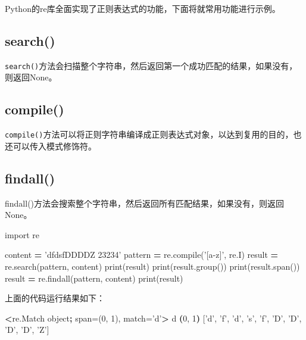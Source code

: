 \documentclass[]{ctexbook}
\newenvironment{Shaded}{\begin{snugshade}}{\end{snugshade}}
\newcommand{\BuiltInTok}[1]{#1}
\newcommand{\ExtensionTok}[1]{#1}
\newcommand{\ImportTok}[1]{#1}
\newcommand{\KeywordTok}[1]{\textcolor[rgb]{0.13,0.29,0.53}{\textbf{#1}}}
\newcommand{\NormalTok}[1]{#1}
\newcommand{\OperatorTok}[1]{\textcolor[rgb]{0.81,0.36,0.00}{\textbf{#1}}}
\newcommand{\StringTok}[1]{\textcolor[rgb]{0.31,0.60,0.02}{#1}}
\newcommand{\VariableTok}[1]{\textcolor[rgb]{0.00,0.00,0.00}{#1}}
\begin{document}
Python的re库全面实现了正则表达式的功能，下面将就常用功能进行示例。

\hypertarget{search}{%
\subsection{search()}\label{search}}

\texttt{search()}方法会扫描整个字符串，然后返回第一个成功匹配的结果，如果没有，则返回None。

\hypertarget{compile}{%
\subsection{compile()}\label{compile}}

\texttt{compile()}方法可以将正则字符串编译成正则表达式对象，以达到复用的目的，也还可以传入模式修饰符。

\hypertarget{findall}{%
\subsection{findall()}\label{findall}}

findall()方法会搜索整个字符串，然后返回所有匹配结果，如果没有，则返回None。

\begin{Shaded}
\begin{Highlighting}[]
\ImportTok{import}\NormalTok{ re}

\NormalTok{content }\OperatorTok{=} \StringTok{'dfdsfDDDDZ 23234'}
\NormalTok{pattern }\OperatorTok{=}\NormalTok{ re.}\BuiltInTok{compile}\NormalTok{(}\StringTok{'[a-z]'}\NormalTok{, re.I)}
\NormalTok{result }\OperatorTok{=}\NormalTok{ re.search(pattern, content)}
\BuiltInTok{print}\NormalTok{(result)}
\BuiltInTok{print}\NormalTok{(result.group())}
\BuiltInTok{print}\NormalTok{(result.span())}
\NormalTok{result }\OperatorTok{=}\NormalTok{ re.findall(pattern, content)}
\BuiltInTok{print}\NormalTok{(result)}
\end{Highlighting}
\end{Shaded}

上面的代码运行结果如下：

\begin{Shaded}
\begin{Highlighting}[]
\OperatorTok{<}\ExtensionTok{re.Match}\NormalTok{ object}\KeywordTok{;} \VariableTok{span=(}\NormalTok{0, 1}\VariableTok{)}\NormalTok{, }\VariableTok{match=}\StringTok{'d'}\OperatorTok{>}
\ExtensionTok{d}
\KeywordTok{(}\ExtensionTok{0}\NormalTok{, 1}\KeywordTok{)}
\NormalTok{[}\StringTok{'d'}\NormalTok{, }\StringTok{'f'}\NormalTok{, }\StringTok{'d'}\NormalTok{, }\StringTok{'s'}\NormalTok{, }\StringTok{'f'}\NormalTok{, }\StringTok{'D'}\NormalTok{, }\StringTok{'D'}\NormalTok{, }\StringTok{'D'}\NormalTok{, }\StringTok{'D'}\NormalTok{, }\StringTok{'Z'}\NormalTok{]}
\end{Highlighting}
\end{Shaded}
\end{document}
